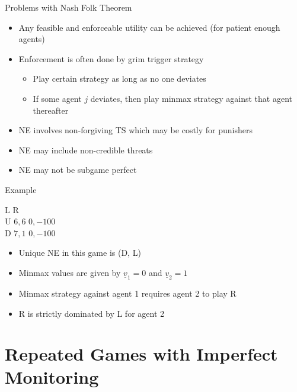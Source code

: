 \documentclass[11pt,aspectratio=169,handout]{beamer}
\begin{document}
  
  \begin{frame}{Problems with Nash Folk Theorem}
   \begin{itemize}[<+->]
    \setlength{\itemsep}{1em}
    \item Any feasible and enforceable utility can be achieved (for \alert{patient enough} agents)
    \item Enforcement is often done by grim trigger strategy
    \begin{itemize}
     \item Play certain strategy as long as no one deviates
     \item If some agent $j$  deviates, then play minmax strategy against that agent thereafter
    \end{itemize}
    \item NE involves non-forgiving TS which may be costly for punishers
    \item NE may include \alert{non-credible threats}
    \item NE may not be subgame perfect
   \end{itemize}
  \end{frame}
  
  
  \begin{frame}{Example}
   \begin{center}
    \hspace{-0.2em}
    \begin{game}{2}{2}
     	\> L			\> R				\\
     U	\> $6, 6$	\> $ 0, -100$	\\
     D	\> $7, 1$	\> $ 0, -100$
    \end{game}
   \end{center}
   \vspace{1em}
   \begin{itemize}
    \item Unique NE in this game is (D, L)
    \item Minmax values are given by $\underline{v}_{1} = 0 $ and $\underline{v}_{2} = 1 $ 
    \item Minmax strategy against agent 1 requires agent 2 to play R
    \item R is strictly dominated by L for agent 2
   \end{itemize}
  \end{frame}
  
 \section{Repeated Games with Imperfect Monitoring}
 
\end{document}
